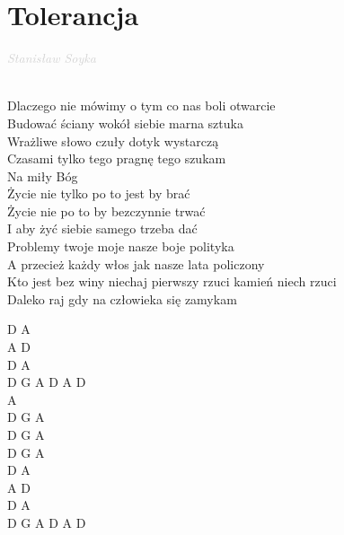 \documentclass[a5paper, 10pt]{book}
\begin{document}
\section{Tolerancja}\textcolor{lightgray}{\textit{Stanisław Soyka}}\\~\\
\begin{minipage}[t]{0.75\textwidth}
  Dlaczego nie mówimy o tym co nas boli otwarcie\\
  Budować ściany wokół siebie marna sztuka\\
  Wrażliwe słowo czuły dotyk wystarczą\\
  Czasami tylko tego pragnę tego szukam\\

  \hspace*{5mm}Na miły Bóg\\
  \hspace*{5mm}Życie nie tylko po to jest by brać\\
  \hspace*{5mm}Życie nie po to by bezczynnie trwać\\
  \hspace*{5mm}I aby żyć siebie samego trzeba dać\\

  Problemy twoje moje nasze boje polityka\\
  A przecież każdy włos jak nasze lata policzony\\
  Kto jest bez winy niechaj pierwszy rzuci kamień niech rzuci\\
  Daleko raj gdy na człowieka się zamykam\\

\end{minipage}
\begin{minipage}[t]{0.25\textwidth}
  D A\\
  A D\\
  D A\\
  D G A D A D\\

  A\\
  D G A\\
  D G A\\
  D G A\\

  D A\\
  A D\\
  D A\\
  D G A D A D\\

\end{minipage}
\end{document}
